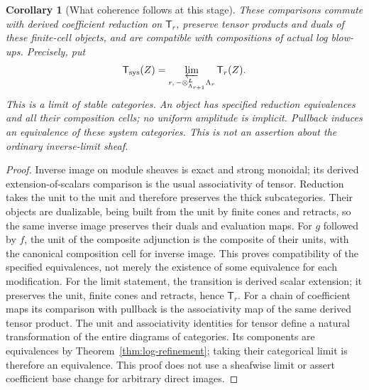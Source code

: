 \documentclass[11pt]{article}
\newtheorem{corollary}[theorem]{Corollary}
\theoremstyle{definition}
\theoremstyle{remark}
\begin{document}
\begin{corollary}[What coherence follows at this stage]
\label{cor:log-coherence}
These comparisons commute with derived coefficient reduction on
$\mathsf T_r$, preserve tensor products and duals of these finite-cell
objects, and are compatible with compositions of actual log blow-ups.
Precisely, put
\[
 \mathsf T_{\mathrm{sys}}(Z)=
 \varprojlim_{r,\,-\otimes^L_{\Lambda_{r+1}}\Lambda_r}\mathsf T_r(Z).
\]
This is a limit of stable categories.  An object has specified reduction
equivalences and all their composition cells; no uniform amplitude is
implicit.  Pullback induces an equivalence of these system categories.
This is not an assertion about the ordinary inverse-limit sheaf.
\end{corollary}
\begin{proof}
Inverse image on module sheaves is exact and strong monoidal; its
derived extension-of-scalars comparison is the usual associativity of
tensor.  Reduction takes the unit to the unit and therefore preserves
the thick subcategories.  Their objects are dualizable, being built
from the unit by finite cones and retracts, so the same inverse image
preserves their duals and evaluation maps.  For $g$ followed by $f$,
the unit of the composite adjunction is the composite of their units,
with the canonical composition cell for inverse image.  This proves
compatibility of the specified equivalences, not merely the existence
of some equivalence for each modification.  For the limit statement, the transition is derived scalar extension;
it preserves the unit, finite cones and retracts, hence $\mathsf T_r$.
For a chain of coefficient maps its comparison with pullback is the
associativity map of the same derived tensor product.  The unit and
associativity identities for tensor define a natural transformation of
the entire diagrams of categories.  Its components are equivalences
by Theorem~\ref{thm:log-refinement}; taking their categorical limit is
therefore an equivalence.  This proof does not use a sheafwise limit
or assert coefficient base change for arbitrary direct images.
\end{proof}
\end{document}
